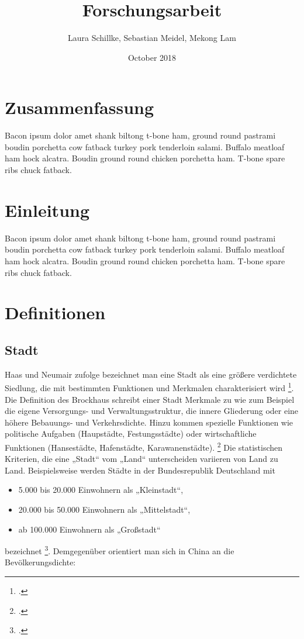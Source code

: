 \documentclass{scrartcl}
\title{Forschungsarbeit}
\author{Laura Schillke, Sebastian Meidel, Mekong Lam }
\date{October 2018}
\begin{document}
\maketitle


\newpage

\setcounter{tocdepth}{3}
\tableofcontents 



\newpage

\section{Zusammenfassung}
Bacon ipsum dolor amet shank biltong t-bone ham, ground round pastrami boudin porchetta cow fatback turkey pork tenderloin salami. Buffalo meatloaf ham hock alcatra. Boudin ground round chicken porchetta ham. T-bone spare ribs chuck fatback.

\section{Einleitung}
Bacon ipsum dolor amet shank biltong t-bone ham, ground round pastrami boudin porchetta cow fatback turkey pork tenderloin salami. Buffalo meatloaf ham hock alcatra. Boudin ground round chicken porchetta ham. T-bone spare ribs chuck fatback.


\section{Definitionen}

\subsection{Stadt}

Haas und Neumair zufolge bezeichnet man eine Stadt als eine größere verdichtete Siedlung, die mit bestimmten Funktionen und Merkmalen charakterisiert wird \footcite{HaasDefinitionWirtschaftslexikon}. Die Definition des Brockhaus schreibt einer Stadt Merkmale zu wie zum Beispiel die eigene Versorgungs- und Verwaltungsstruktur, die innere Gliederung oder eine höhere Bebauungs- und Verkehrsdichte. Hinzu kommen spezielle Funktionen wie politische Aufgaben (Haupstädte, Festungsstädte) oder wirtschaftliche Funktionen (Hansestädte, Hafenstädte, Karawanenstädte). \footcite{BrockhausStadt} Die statistischen Kriterien, die eine „Stadt“ vom „Land“ unterscheiden variieren von Land zu Land. Beispielsweise werden Städte in der Bundesrepublik Deutschland mit 
\begin{itemize}
\item 5.000 bis 20.000 Einwohnern als „Kleinstadt“,
\item 20.000 bis 50.000 Einwohnern als „Mittelstadt“,
\item ab 100.000 Einwohnern als „Großstadt“ 
\end{itemize}
bezeichnet \footcite{Institutinternationaldestatistique1887BulletinStatistique}. Demgegenüber orientiert man sich in China an die Bevölkerungsdichte: 
\end{document}
